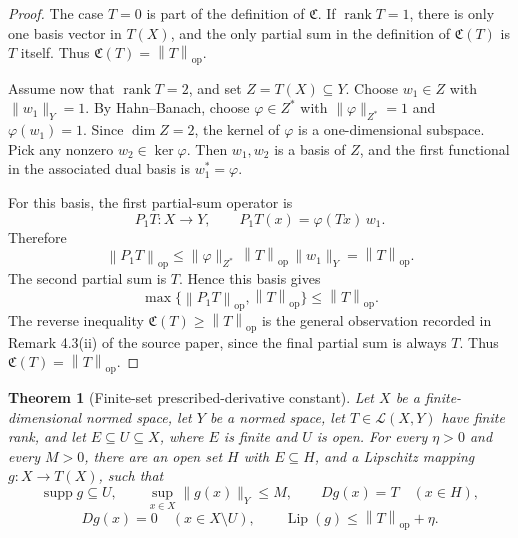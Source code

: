 \documentclass[11pt]{article}
\newtheorem{theorem}{Theorem}
\DeclareMathOperator{\rank}{rank}
\DeclareMathOperator{\Lip}{Lip}
\newcommand{\cyl}{\mathfrak C}
\newcommand{\opnorm}[1]{\left\|#1\right\|_{\mathrm{op}}}
\begin{document}
\begin{proof}
The case \(T=0\) is part of the definition of \(\cyl\).  If \(\rank T=1\),
there is only one basis vector in \(T(X)\), and the only partial sum in the
definition of \(\cyl(T)\) is \(T\) itself.  Thus \(\cyl(T)=\opnorm{T}\).

Assume now that \(\rank T=2\), and set \(Z=T(X)\subseteq Y\).  Choose
\(w_1\in Z\) with \(\|w_1\|_Y=1\).  By Hahn--Banach, choose
\(\varphi\in Z^*\) with \(\|\varphi\|_{Z^*}=1\) and \(\varphi(w_1)=1\).  Since
\(\dim Z=2\), the kernel of \(\varphi\) is a one-dimensional subspace.  Pick
any nonzero \(w_2\in\ker\varphi\).  Then \(w_1,w_2\) is a basis of \(Z\), and
the first functional in the associated dual basis is \(w_1^*=\varphi\).

For this basis, the first partial-sum operator is
\[
  P_1T:X\to Y,\qquad P_1T(x)=\varphi(Tx)\,w_1.
\]
Therefore
\[
  \opnorm{P_1T}\leq \|\varphi\|_{Z^*}\,\opnorm{T}\,\|w_1\|_Y=\opnorm{T}.
\]
The second partial sum is \(T\).  Hence this basis gives
\[
  \max\{\opnorm{P_1T},\opnorm{T}\}\leq \opnorm{T}.
\]
The reverse inequality \(\cyl(T)\geq \opnorm{T}\) is the general observation
recorded in Remark 4.3(ii) of the source paper, since the final partial sum is
always \(T\).  Thus \(\cyl(T)=\opnorm{T}\).
\end{proof}

\begin{theorem}[Finite-set prescribed-derivative constant]
Let \(X\) be a finite-dimensional normed space, let \(Y\) be a normed space,
let \(T\in\mathcal L(X,Y)\) have finite rank, and let \(E\subseteq U\subseteq X\),
where \(E\) is finite and \(U\) is open.  For every \(\eta>0\) and every
\(M>0\), there are an open set \(H\) with \(E\subseteq H\), and a Lipschitz
mapping \(g:X\to T(X)\), such that
\[
  \operatorname{supp}g\subseteq U,\qquad
  \sup_{x\in X}\|g(x)\|_Y\leq M,\qquad
  Dg(x)=T\quad(x\in H),
\]
\[
  Dg(x)=0\quad(x\in X\setminus U),\qquad
  \Lip(g)\leq \opnorm{T}+\eta.
\]
\end{theorem}
\end{document}
